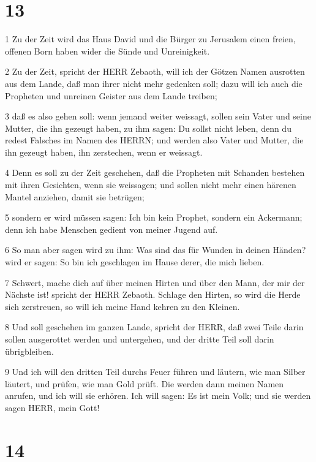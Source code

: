 \chapter{13}

\par 1 Zu der Zeit wird das Haus David und die Bürger zu Jerusalem einen freien, offenen Born haben wider die Sünde und Unreinigkeit.
\par 2 Zu der Zeit, spricht der HERR Zebaoth, will ich der Götzen Namen ausrotten aus dem Lande, daß man ihrer nicht mehr gedenken soll; dazu will ich auch die Propheten und unreinen Geister aus dem Lande treiben;
\par 3 daß es also gehen soll: wenn jemand weiter weissagt, sollen sein Vater und seine Mutter, die ihn gezeugt haben, zu ihm sagen: Du sollst nicht leben, denn du redest Falsches im Namen des HERRN; und werden also Vater und Mutter, die ihn gezeugt haben, ihn zerstechen, wenn er weissagt.
\par 4 Denn es soll zu der Zeit geschehen, daß die Propheten mit Schanden bestehen mit ihren Gesichten, wenn sie weissagen; und sollen nicht mehr einen härenen Mantel anziehen, damit sie betrügen;
\par 5 sondern er wird müssen sagen: Ich bin kein Prophet, sondern ein Ackermann; denn ich habe Menschen gedient von meiner Jugend auf.
\par 6 So man aber sagen wird zu ihm: Was sind das für Wunden in deinen Händen? wird er sagen: So bin ich geschlagen im Hause derer, die mich lieben.
\par 7 Schwert, mache dich auf über meinen Hirten und über den Mann, der mir der Nächste ist! spricht der HERR Zebaoth. Schlage den Hirten, so wird die Herde sich zerstreuen, so will ich meine Hand kehren zu den Kleinen.
\par 8 Und soll geschehen im ganzen Lande, spricht der HERR, daß zwei Teile darin sollen ausgerottet werden und untergehen, und der dritte Teil soll darin übrigbleiben.
\par 9 Und ich will den dritten Teil durchs Feuer führen und läutern, wie man Silber läutert, und prüfen, wie man Gold prüft. Die werden dann meinen Namen anrufen, und ich will sie erhören. Ich will sagen: Es ist mein Volk; und sie werden sagen HERR, mein Gott!

\chapter{14}

